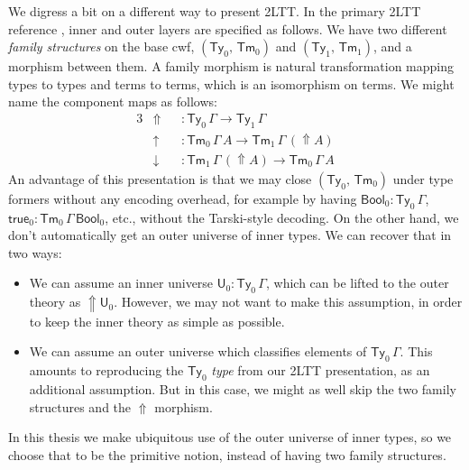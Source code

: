 \documentclass[12pt,a4paper,twoside,openany]{book}
\theoremstyle{remark}
\theoremstyle{definition}
\theoremstyle{theorem}
\newcommand{\ms}[1]{\mathsf{#1}}
\newcommand{\Tm}{\mathsf{Tm}}
\newcommand{\Ty}{\mathsf{Ty}}
\newcommand{\U}{\mathsf{U}}
\newcommand{\Lift}{\Uparrow}
\newcommand{\Bool}{\ms{Bool}}
\newcommand{\true}{\ms{true}}
\newcommand{\up}{\uparrow}
\newcommand{\down}{\downarrow}
\begin{document}
We digress a bit on a different way to present 2LTT. In the primary 2LTT
reference \cite{twolevel}, inner and outer layers are specified
as follows. We have two different \emph{family structures} on the base
cwf, $(\Ty_0,\,\Tm_0)$ and $(\Ty_1,\,\Tm_1)$, and a morphism between them. A
family morphism is natural transformation mapping types to types and terms to
terms, which is an isomorphism on terms. We might name the component maps
as follows:
\begin{alignat*}{3}
  &\Lift &&: \Ty_0\,\Gamma \to \Ty_1\,\Gamma \\
  &\up   &&: \Tm_0\,\Gamma\,A \to \Tm_1\,\Gamma\,(\Lift\!A)\\
  &\down &&: \Tm_1\,\Gamma\,(\Lift\!A) \to \Tm_0\,\Gamma\,A
\end{alignat*}
An advantage of this presentation is that we may close $(\Ty_0,\,\Tm_0)$ under
type formers without any encoding overhead, for example by having $\Bool_0 :
\Ty_0\,\Gamma$, $\true_0 : \Tm_0\,\Gamma\,\Bool_0$, etc., without the
Tarski-style decoding. On the other hand, we don't automatically get an outer
universe of inner types. We can recover that in two ways:
\begin{itemize}
\item
  We can assume an inner universe $\U_0 : \Ty_0\,\Gamma$, which can be lifted to the
  outer theory as $\Lift\!\U_0$. However, we may not want to make this
  assumption, in order to keep the inner theory as simple as possible.
\item
  We can assume an outer universe which classifies elements of
  $\Ty_0\,\Gamma$. This amounts to reproducing the $\Ty_0$ \emph{type} from our
  2LTT presentation, as an additional assumption. But in this case, we might as
  well skip the two family structures and the $\Lift$ morphism.
\end{itemize}
In this thesis we make ubiquitous use of the outer universe of inner types, so
we choose that to be the primitive notion, instead of having two family
structures.
\end{document}
